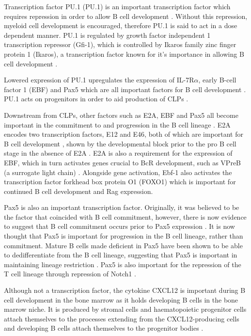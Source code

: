 Transcription factor PU.1 (PU.1) is an important transcription factor which requires repression in order to allow B cell development \citep{Dekoter2000}. 
Without this repression, myeloid cell development is encouraged, therefore PU.1 is said to act in a dose dependent manner.
PU.1 is regulated by growth factor independent 1 transcription repressor (Gfi-1), which is controlled by Ikaros family zinc finger protein 1 (Ikaros), a transcription factor known for it's importance in allowing B cell development \citep{Yoshida2006, Busslinger2004}. 

Lowered expression of PU.1 upregulates the expression of IL-7R$\alpha$, early B-cell factor 1 (EBF) and Pax5 which are all important factors for B cell development \citep{Hagman2006}.
PU.1 acts on progenitors in order to aid production of CLPs \citep{Hagman2006}.

Downstream from CLPs, other factors such as E2A, EBF and Pax5 all become important in the commitment to and progression in the B cell lineage \citep{Mansson2008}.
E2A encodes two transcription factors, E12 and E46, both of which are important for B cell development \citep{Bain1997}, shown by the developmental block prior to the pro B cell stage in the absence of E2A \citep{Bain1994}.
E2A is also a requirement for the expression of EBF, which in turn activates genes crucial to BcR development, such as VPreB (a surrogate light chain) \citep{Welinder2011}.
Alongside gene activation, Ebf-1 also activates the transcription factor forkhead box protein O1 (FOXO1) which is important for continued B cell development and Rag expression\citep{Amin2008}.

Pax5 is also an important transcription factor.
Originally, it was believed to be the factor that coincided with B cell commitment, however, there is now evidence to suggest that B cell commitment occurs prior to Pax5 expression \citep{Mansson2008}.
It is now thought that Pax5 is important for progression in the B cell lineage, rather than commitment.
Mature B cells made deficient in Pax5 have been shown to be able to dedifferentiate from the B cell lineage, suggesting that Pax5 is important in maintaining lineage restriction \citep{Cobaleda2007}.
Pax5 is also important for the repression of the T cell lineage through repression of Notch1 \citep{Souabni2002}.

Although not a transcription factor, the cytokine CXCL12 is important during B cell development in the bone marrow as it holds developing B cells in the bone marrow niche.
It is produced by stromal cells and haematopoietic progenitor cells attach themselves to the processes extending from the CXCL12-producing cells and developing B cells attach themselves to the progenitor bodies \citep{Tokoyoda2004}.

